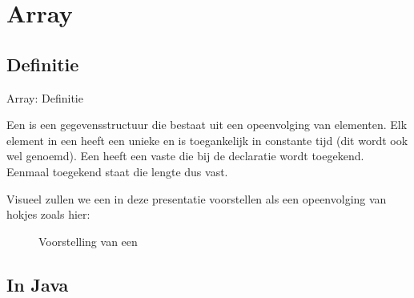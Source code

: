 \section{Array}
\subsection{Definitie}
\begin{frame}{Array: Definitie}
\begin{definition}[Array]
Een \term{\dsarray{}} is een gegevensstructuur die bestaat uit een opeenvolging van elementen. Elk element in een \dsarray{} heeft een unieke  en is toegankelijk in constante tijd (dit wordt ook wel  genoemd). Een \dsarray{} heeft een vaste  die bij de declaratie wordt toegekend. Eenmaal toegekend staat die lengte dus vast.
\end{definition}
Visueel zullen we een \dsarray{} in deze presentatie voorstellen als een opeenvolging van hokjes zoals hier:
\begin{figure}
\caption{Voorstelling van een \dsarray{}}
\end{figure}
\end{frame}
\subsection{In Java}
